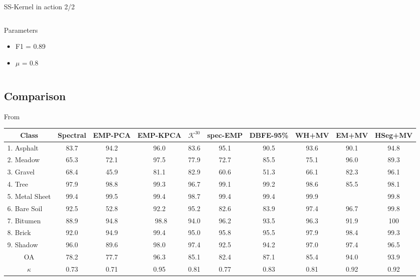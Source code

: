 \documentclass[10pt,aspectratio=1610,,color={dvipsnames,usenames,table},table]{beamer}
\begin{document}
\begin{frame}[label={sec:orgf68013a}]{SS-Kernel in action 2/2}
\begin{columns}
\begin{column}{0.3\columnwidth}
\begin{block}{Parameters}
\begin{itemize}
\item F1 = 0.89
\item \(\mu\) = 0.8
\end{itemize}
\end{block}
\end{column}
\end{columns}
\end{frame}

\subsection{Comparison}
\label{sec:org3ef1f1e}
\begin{frame}[label={sec:orgdbb0458}]{From \cite{fauvel2013advances}}
\begin{center}\scriptsize
  \begin{tabular}{cccccccccc}
    \toprule
    Class  & Spectral &EMP-PCA &EMP-KPCA  & $\mathcal{K}^{30}$ & spec-EMP & DBFE-95\%& WH+MV & EM+MV & HSeg+MV\\
    \midrule
    \multicolumn{1}{l}{1. Asphalt}      & 83.7 & 94.2 & \cellcolor{orange} 96.0 & 83.6 & 95.1 & 90.5&  93.6 & 90.1 &  94.8\\
    \multicolumn{1}{l}{2. Meadow}       & 65.3 & 72.1 & \cellcolor{orange} 97.5 & 77.9 & 72.7 & 85.5&  75.1 & 96.0 &  89.3\\
    \multicolumn{1}{l}{3. Gravel}       & 68.4 & 45.9 &  81.1 &  82.9 & 60.6 & 51.3  &  66.1 & 82.3 &\cellcolor{orange} 96.1\\
    \multicolumn{1}{l}{4. Tree}         & 97.9 & 98.8 & \cellcolor{orange} 99.3 & 96.7 & 99.1 & 99.2&  98.6 & 85.5 &  98.1\\
    \multicolumn{1}{l}{5. Metal Sheet}  & 99.4 & 99.5 &  99.4 & 98.7 & 99.4 & 99.4&   99.9 &\cellcolor{orange} &  99.8\\
    \multicolumn{1}{l}{6. Bare Soil}    & 92.5 & 52.8 & 92.2 &  95.2 & 82.6 & 83.9 &  97.4  & 96.7 &\cellcolor{orange}  99.8 \\
    \multicolumn{1}{l}{7. Bitumen}      & 88.9 & 94.8 & \ 98.8 & 94.0 & 96.2 & 93.5&    96.3 & 91.9 & \cellcolor{orange}100\\
    \multicolumn{1}{l}{8. Brick}        & 92.0 & 94.9 & \cellcolor{orange} 99.4 & 95.0 & 95.8 & 95.5  &   97.9  &  98.4 & 99.3\\
    \multicolumn{1}{l}{9. Shadow}       & 96.0 & 89.6 & \cellcolor{orange} 98.0 & 97.4 & 92.5 & 94.2  &   97.0 &  97.4  &   96.5\\
    \midrule
    OA                                     & 78.2 & 77.7 &\cellcolor{orange} 96.3 & 85.1 & 82.4 & 87.1 &  85.4 & 94.0 &  93.9\\
    \midrule
    $\kappa$                               & 0.73 & 0.71 &\cellcolor{orange} 0.95 & 0.81 & 0.77 & 0.83&  0.81 & 0.92 &  0.92\\
    \bottomrule
  \end{tabular}
\end{center}
\end{frame}
\end{document}
